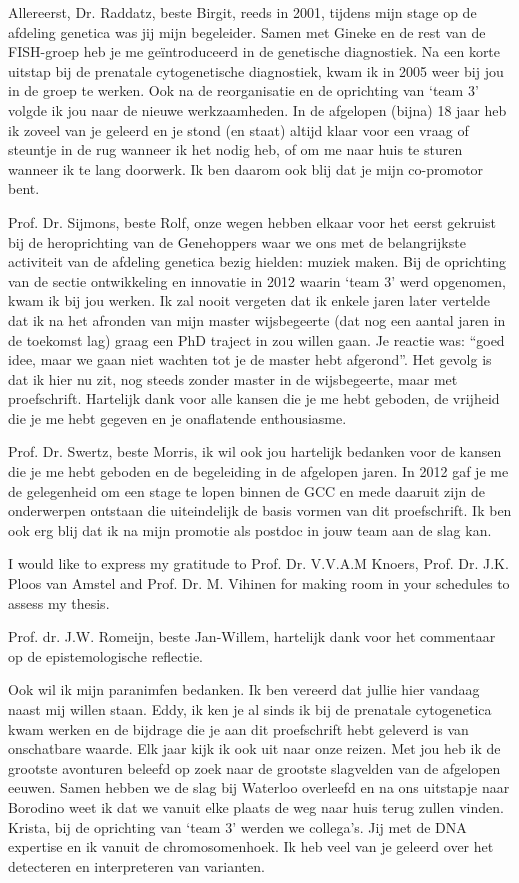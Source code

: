 \begin{appendices}
Allereerst, Dr. Raddatz, beste Birgit, reeds in 2001, tijdens mijn stage op de afdeling genetica was jij mijn begeleider. Samen met Gineke en de rest van de FISH-groep heb je me geïntroduceerd in de genetische diagnostiek. Na een korte uitstap bij de prenatale cytogenetische diagnostiek, kwam ik in 2005 weer bij jou in de groep te werken. Ook na de reorganisatie en de oprichting van ‘team 3’ volgde ik jou naar de nieuwe werkzaamheden. In de afgelopen (bijna) 18 jaar heb ik zoveel van je geleerd en je stond (en staat) altijd klaar voor een vraag of steuntje in de rug wanneer ik het nodig heb, of om me naar huis te sturen wanneer ik te lang doorwerk. Ik ben daarom ook blij dat je mijn co-promotor bent. 

Prof. Dr. Sijmons, beste Rolf, onze wegen hebben elkaar voor het eerst gekruist bij de heroprichting van de Genehoppers waar we ons met de belangrijkste activiteit van de afdeling genetica bezig hielden: muziek maken. Bij de oprichting van de sectie ontwikkeling en innovatie in 2012 waarin ‘team 3’ werd opgenomen, kwam ik bij jou werken. Ik zal nooit vergeten dat ik enkele jaren later vertelde dat ik na het afronden van mijn master wijsbegeerte (dat nog een aantal jaren in de toekomst lag) graag een PhD traject in zou willen gaan. Je reactie was: “goed idee, maar we gaan niet wachten tot je de master hebt afgerond”. Het gevolg is dat ik hier nu zit, nog steeds zonder master in de wijsbegeerte, maar met proefschrift. Hartelijk dank voor alle kansen die je me hebt geboden, de vrijheid die je me hebt gegeven en je onaflatende enthousiasme. 

Prof. Dr. Swertz, beste Morris, ik wil ook jou hartelijk bedanken voor de kansen die je me hebt geboden en de begeleiding in de afgelopen jaren. In 2012 gaf je me de gelegenheid om een stage te lopen binnen de GCC en mede daaruit zijn de onderwerpen ontstaan die uiteindelijk de basis vormen van dit proefschrift. Ik ben ook erg blij dat ik na mijn promotie als postdoc in jouw team aan de slag kan. 

I would like to express my gratitude to Prof. Dr. V.V.A.M Knoers, Prof. Dr. J.K. Ploos van Amstel and Prof. Dr. M. Vihinen for making room in your schedules to assess my thesis. 

Prof. dr. J.W. Romeijn, beste Jan-Willem, hartelijk dank voor het commentaar op de epistemologische reflectie.

Ook wil ik mijn paranimfen bedanken. Ik ben vereerd dat jullie hier vandaag naast mij willen staan. Eddy, ik ken je al sinds ik bij de prenatale cytogenetica kwam werken en de bijdrage die je aan dit proefschrift hebt geleverd is van onschatbare waarde. Elk jaar kijk ik ook uit naar onze reizen. Met jou heb ik de grootste avonturen beleefd op zoek naar de grootste slagvelden van de afgelopen eeuwen. Samen hebben we de slag bij Waterloo overleefd en na ons uitstapje naar Borodino weet ik dat we vanuit elke plaats de weg naar huis terug zullen vinden. Krista, bij de oprichting van ‘team 3’ werden we collega’s. Jij met de DNA expertise en ik vanuit de chromosomenhoek. Ik heb veel van je geleerd over het detecteren en interpreteren van varianten. 


\end{appendices}
